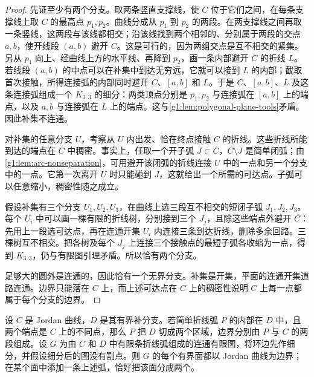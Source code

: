 \begin{proof}
	先证至少有两个分支。取两条竖直支撑线，使 \(C\) 位于它们之间，在每条支撑线上取 \(C\) 的最高点 \(p_1,p_2\)。曲线分成从 \(p_1\) 到 \(p_2\) 的两段。在两支撑线之间再取一条竖线，这两段与该线都相交；沿该线找到两个相邻的、分别属于两段的交点 \(a,b\)，使开线段 \((a,b)\) 避开 \(C\)。这是可行的，因为两组交点是互不相交的紧集。另从 \(p_1\) 向上、经曲线上方的水平线、再降到 \(p_2\)，画一条内部避开 \(C\) 的折线 \(L\)。若线段 \((a,b)\) 的中点可以在补集中到达无穷远，它就可以接到 \(L\) 的内部；截取首次接触，所得连接弧的内部同时避开 \(C\)、\([a,b]\) 和 \(L\)。于是 \(C\)、\([a,b]\)、\(L\) 及这条连接弧组成一个 \(K_{3,3}\) 的细分：两类顶点分别是 \(p_1,p_2\) 与连接弧在 \([a,b]\) 上的端点，以及 \(a,b\) 与连接弧在 \(L\) 上的端点。这与\cref{g1:lem:polygonal-plane-tools}矛盾。因此补集不连通。

	对补集的任意分支 \(U\)，考察从 \(U\) 内出发、恰在终点接触 \(C\) 的折线。这些折线所能到达的端点在 \(C\) 中稠密。事实上，任取一个开子弧 \(J\subset C\)，\(C\setminus J\) 是简单闭弧；由\cref{g1:lem:arc-nonseparation}，可用避开该闭弧的折线连接 \(U\) 中的一点和另一个分支中的一点。它第一次离开 \(U\) 时只能碰到 \(J\)，这就给出一个所需的可达点。子弧可以任意缩小，稠密性随之成立。

	假设补集有三个分支 \(U_1,U_2,U_3\)，在曲线上选三段互不相交的短闭子弧 \(J_1,J_2,J_3\)。每个 \(U_i\) 中可以画一棵有限的折线树，分别接到三个 \(J_j\)，且除这些端点外避开 \(C\)：先用上一段选可达点，再在连通开集 \(U_i\) 内连接三条到达折线，删除多余回路。三棵树互不相交。把各树及每个 \(J_j\) 上连接三个接触点的最短子弧各收缩为一点，得到 \(K_{3,3}\)，仍与有限图引理矛盾。所以恰有两个分支。

	足够大的圆外是连通的，因此恰有一个无界分支。补集是开集，平面的连通开集道路连通。边界只能落在 \(C\) 上，而上述可达点在 \(C\) 上的稠密性说明 \(C\) 上每一点都属于每个分支的边界。
\end{proof}

\begin{lemma}\label{g1:lem:jordan-crosscuts}
	设 \(C\) 是 Jordan 曲线，\(D\) 是其有界补分支。若简单折线弧 \(P\) 的内部在 \(D\) 中，且两个端点是 \(C\) 上的不同点，那么 \(P\) 把 \(D\) 切成两个区域，边界分别由 \(P\) 与 \(C\) 的两段组成。设 \(G\) 为由 \(C\) 和 \(D\) 中有限条折线弧组成的连通有限图，将环边先作细分，并假设细分后的图没有割点。则 \(G\) 的每个有界面都以 Jordan 曲线为边界；在某个面中添加一条上述弧，恰好把该面分成两个。
\end{lemma}


